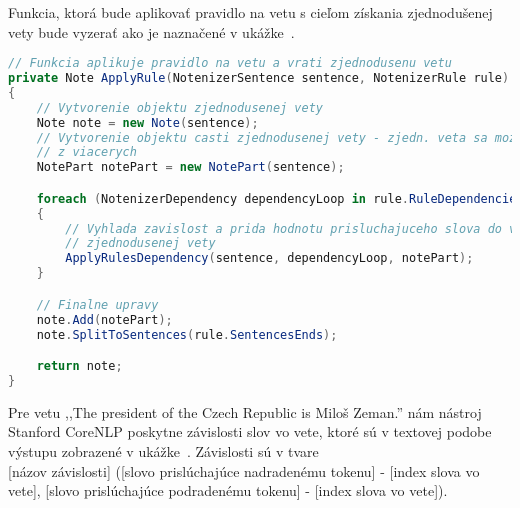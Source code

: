 Funkcia, ktorá bude aplikovať pravidlo na vetu s cieľom získania zjednodušenej vety bude vyzerať ako je naznačené v ukážke~.
\\

\begin{lstlisting}[language = csharp, caption={Aplikovanie pravidla}, label = {code:apply_rule_example}]
// Funkcia aplikuje pravidlo na vetu a vrati zjednodusenu vetu
private Note ApplyRule(NotenizerSentence sentence, NotenizerRule rule)
{
	// Vytvorenie objektu zjednodusenej vety
	Note note = new Note(sentence);
	// Vytvorenie objektu casti zjednodusenej vety - zjedn. veta sa moze skladat
	// z viacerych
	NotePart notePart = new NotePart(sentence);

	foreach (NotenizerDependency dependencyLoop in rule.RuleDependencies)
	{
		// Vyhlada zavislost a prida hodnotu prisluchajuceho slova do vyslednej
		// zjednodusenej vety
		ApplyRulesDependency(sentence, dependencyLoop, notePart);
	}

	// Finalne upravy
	note.Add(notePart);
	note.SplitToSentences(rule.SentencesEnds);

	return note;
}
\end{lstlisting}

Pre vetu ,,The president of the Czech Republic is Miloš Zeman.'' nám nástroj Stanford CoreNLP poskytne závislosti slov vo vete, ktoré sú v textovej podobe výstupu zobrazené v ukážke~. Závislosti sú v tvare\\ 

[názov závislosti] ([slovo prislúchajúce nadradenému tokenu] - [index slova vo vete], [slovo prislúchajúce podradenému tokenu] - [index slova vo vete]).\\

